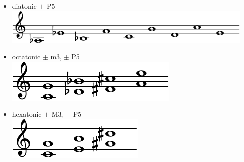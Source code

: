 \begin{frame}[fragile]{\insertsectionhead}

  \begin{columns}
    \begin{column}{.5\linewidth}

      \begin{itemize}
        \item<2-> \alert{diatonic} $\pm$ P5\\
        \vspace{1em}
          \includegraphics[width=\linewidth]{scores/diatonic.pdf}
        \item<3-> \alert{octatonic} $\pm$ m3, $\pm$ P5\\
        \vspace{1em}
          \includegraphics[width=.55\linewidth]{scores/octatonic.pdf}
        \item<4-> \alert{hexatonic} $\pm$ M3, $\pm$ P5\\
        \vspace{1em}
          \includegraphics[width=.45\linewidth]{scores/hexatonic.pdf}
      \end{itemize}
    \end{column}
    \begin{column}{.5\linewidth}


\end{column}
\end{columns}
\end{frame}
